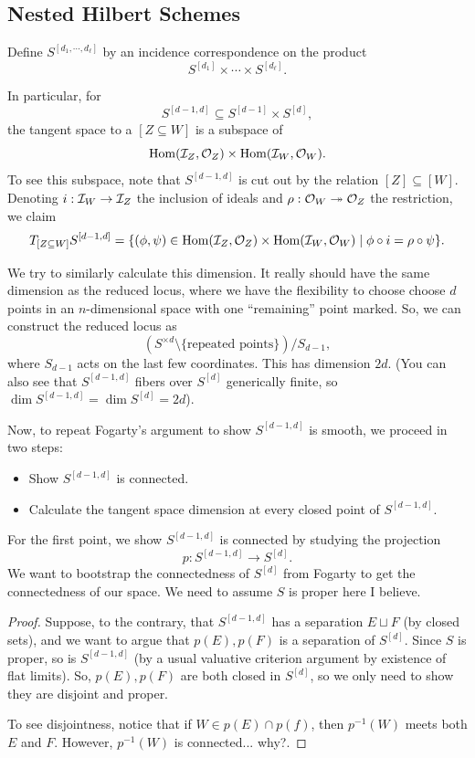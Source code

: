 \documentclass[12pt]{article}
\begin{document}
\subsection{Nested Hilbert Schemes}

Define $S^{[d_1,\cdots,d_\ell]}$ by an incidence correspondence on the product
\[S^{[d_1]} \times \cdots \times S^{[d_\ell]}.\]

In particular, for
\[S^{[d-1,d]} \subseteq S^{[d-1]} \times S^{[d]},\]
the tangent space to a $[Z\subseteq W]$ is a subspace of
\[\mathrm{Hom}(\mathcal{I}_Z,\mathcal{O}_Z) \times \mathrm{Hom}(\mathcal{I}_W,\mathcal{O}_W).\]
To see this subspace, note that $S^{[d-1,d]}$ is cut out by the relation $[Z]\subseteq [W]$. Denoting $i:\mathcal{I}_W\to \mathcal{I}_Z$ the inclusion of ideals and $\rho: \mathcal{O}_W\twoheadrightarrow \mathcal{O}_Z$ the restriction, {\color{red} we claim}
\[T_{[Z\subseteq W]} S^{[d-1,d]} = \{(\phi,\psi) \in \Hom(\cI_Z,\cO_Z) \times \Hom(\cI_W,\cO_W) \mid \phi \circ i = \rho \circ \psi\}.\]

We try to similarly calculate this dimension. It really should have the same dimension as the reduced locus, where we have the flexibility to choose choose $d$ points in an $n$-dimensional space with one ``remaining'' point marked. So, {\color{red} we can construct the reduced locus as}
\[(S^{\times d} \setminus\{\text{repeated points}\}) / S_{d-1},\]
where $S_{d-1}$ acts on the last few coordinates. This has dimension $2d$. (You can also see that $S^{[d-1,d]}$ fibers over $S^{[d]}$ generically finite, so $\dim S^{[d-1,d]} = \dim S^{[d]} = 2d$).

Now, to repeat Fogarty's argument to show $S^{[d-1,d]}$ is smooth, we proceed in two steps:
\begin{itemize}
    \item Show $S^{[d-1,d]}$ is connected.
    \item Calculate the tangent space dimension at every closed point of $S^{[d-1,d]}$.
\end{itemize}

For the first point, we show $S^{[d-1,d]}$ is connected by studying the projection
\[p: S^{[d-1,d]} \to S^{[d]}.\]
We want to bootstrap the connectedness of $S^{[d]}$ from Fogarty to get the connectedness of our space. {\color{red} We need to assume $S$ is proper here I believe.}

\begin{proof}
    Suppose, to the contrary, that $S^{[d-1,d]}$ has a separation $E\sqcup F$ (by closed sets), and we want to argue that $p(E),p(F)$ is a separation of $S^{[d]}$. Since $S$ is proper, so is $S^{[d-1,d]}$ (by a usual valuative criterion argument by existence of flat limits). So, $p(E),p(F)$ are both closed in $S^{[d]}$, so we only need to show they are disjoint and proper.

    To see disjointness, notice that if $W\in p(E)\cap p(f)$, then $p^{-1}(W)$ meets both $E$ and $F$. However, $p^{-1}(W)$ is {\color{blue} connected... why?}.
\end{proof}
\end{document}
